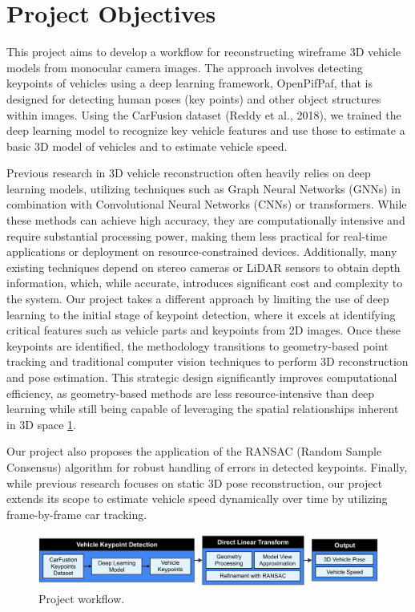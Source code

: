 \documentclass[conference]{IEEEtran}
\begin{document}
\section{Project Objectives}

This project aims to develop a workflow for reconstructing wireframe 3D vehicle models from monocular camera images. The approach involves detecting keypoints of vehicles using a deep learning framework, OpenPifPaf, that is designed for detecting human poses (key points) and other object structures within images. Using the CarFusion dataset (Reddy et al., 2018), we trained the deep learning model to recognize key vehicle features and use those to estimate a basic 3D model of vehicles and to estimate vehicle speed.

Previous research in 3D vehicle reconstruction often heavily relies on deep learning models, utilizing techniques such as Graph Neural Networks (GNNs) in combination with Convolutional Neural Networks (CNNs) or transformers. While these methods can achieve high accuracy, they are computationally intensive and require substantial processing power, making them less practical for real-time applications or deployment on resource-constrained devices. Additionally, many existing techniques depend on stereo cameras or LiDAR sensors to obtain depth information, which, while accurate, introduces significant cost and complexity to the system. Our project takes a different approach by limiting the use of deep learning to the initial stage of keypoint detection, where it excels at identifying critical features such as vehicle parts and keypoints from 2D images. Once these keypoints are identified, the methodology transitions to geometry-based point tracking and traditional computer vision techniques to perform 3D reconstruction and pose estimation. This strategic design significantly improves computational efficiency, as geometry-based methods are less resource-intensive than deep learning while still being capable of leveraging the spatial relationships inherent in 3D space
\ref{img:workflow}.

Our project also proposes the application of the RANSAC (Random Sample Consensus) algorithm for robust handling of errors in detected keypoints. Finally, while previous research focuses on static 3D pose reconstruction, our project extends its scope to estimate vehicle speed dynamically over time by utilizing frame-by-frame car tracking.

\begin{figure}
    \centering
    \includegraphics[width=1\columnwidth]{./images/workflow.png}
    \caption{Project workflow.}
    \label{img:workflow}
\end{figure}
\end{document}
